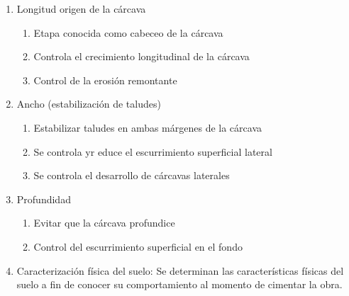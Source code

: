     \begin{enumerate}
        \item Longitud origen de la cárcava \begin{enumerate}
            \item Etapa conocida como cabeceo de la cárcava
            \item Controla el crecimiento longitudinal de la cárcava
            \item Control de la erosión remontante
        \end{enumerate}
        \item Ancho (estabilización de taludes) \begin{enumerate}
            \item Estabilizar taludes en ambas márgenes de la cárcava
            \item Se controla yr educe el escurrimiento superficial lateral
            \item Se controla el desarrollo de cárcavas laterales
        \end{enumerate}
        \item Profundidad \begin{enumerate}
            \item Evitar que la cárcava profundice
            \item Control del escurrimiento superficial en el fondo
        \end{enumerate}
        \item Caracterización física del suelo: Se determinan las características físicas del suelo a fin de conocer su comportamiento al momento de cimentar la obra.
    \end{enumerate}
